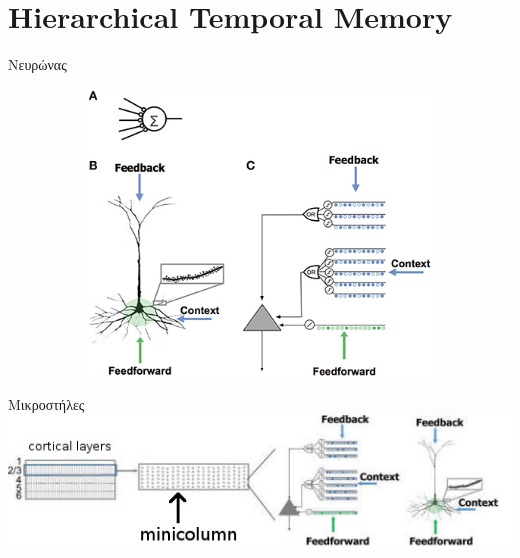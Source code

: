 \documentclass[10pt,lualatex]{beamer}
\title{\huge{\titlestring}}
\author{\authorstring\\
Επιβλέπων καθηγητής: Νίκος Πιτσιάνης}
\date{13 Ιουνίου 2019}
\begin{document}
\begin{frame}%
  \titlepage
\end{frame}

\section{Hierarchical Temporal Memory}

\begin{frame}{Νευρώνας}
  \centering
	\begin{figure}[h]
		\begin{subfigure}{0.30\textwidth}
			
		\end{subfigure}
		\hfill
		\begin{subfigure}{0.65\textwidth}
			\includegraphics[width=\textwidth]{../figures/numenta_neuron}
		\end{subfigure}
	\end{figure}
\end{frame}

\begin{frame}{Μικροστήλες}
  \centering
  \includegraphics[width=.85\textwidth]{../figures/layer-minicolumn}
\end{frame}
\end{document}
